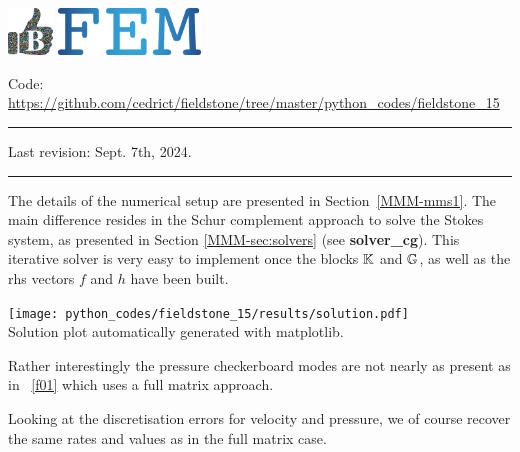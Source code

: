 \includegraphics[height=1.25cm]{images/pictograms/benchmark}
\includegraphics[height=1.25cm]{images/pictograms/FEM}


%

\begin{center}
\inpython
{\small Code: \url{https://github.com/cedrict/fieldstone/tree/master/python_codes/fieldstone_15}}
\end{center}

\par\noindent\rule{\textwidth}{0.4pt}

Last revision: Sept. 7th, 2024.

\par\noindent\rule{\textwidth}{0.4pt}

The details of the numerical setup are presented in Section~\ref{MMM-mms1}.
The main difference resides in the Schur complement approach to solve the 
Stokes system, as presented in Section \ref{MMM-sec:solvers} (see {\bf solver\_cg}).
This iterative solver is very easy to implement once the blocks ${\mathbb{K}}$ and ${\mathbb{G}}$, 
as well as the rhs vectors $f$ and $h$ have been built. 

\begin{center}
\texttt{[image: python\_codes/fieldstone\_15/results/solution.pdf]}\\
{\captionfont Solution plot automatically generated with matplotlib.}
\end{center}

Rather interestingly the pressure checkerboard modes are not nearly as present as 
in \stone~\ref{f01} which uses a full matrix approach. 

Looking at the discretisation errors for velocity and pressure, we 
of course recover the same rates and values as in the full matrix case.

